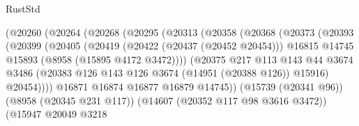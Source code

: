 \begin{lexlean}{RustStd}
\begin{coremodule}
                                  (@20260
                                    (@20264
                                      (@20268
                                        (@20295
                                          (@20313
                                            (@20358
                                              (@20368
                                                (@20373
                                                  (@20393
                                                    (@20399
                                                      (@20405
                                                        (@20419
                                                          (@20422 (@20437 (@20452 @20454)))
                                                          @16815
                                                          @14745
                                                          @15893
                                                          (@8958 (@15895 @4172 @3472))))
                                                      (@20375
                                                        @217
                                                        @113
                                                        @143
                                                        @44
                                                        @3674
                                                        @3486
                                                        (@20383
                                                          @126
                                                          @143
                                                          @126
                                                          @3674
                                                          (@14951 (@20388 @126))
                                                          @15916)
                                                        @20454))))
                                                @16871
                                                @16874
                                                @16877
                                                @16879
                                                @14745))
                                            (@15739 (@20341 @96))
                                            (@8958 (@20345 @231 @117))
                                            (@14607 (@20352 @117 @98 @3616 @3472))
                                            (@15947
                                              @20049
                                              @3218

\end{coremodule}
\end{lexlean}

